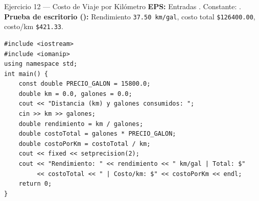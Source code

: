 \documentclass[11pt,letterpaper]{article}
\begin{document}
\begin{solucion}{Ejercicio 12 --- Costo de Viaje por Kilómetro}
\textbf{EPS:} Entradas . Constante: .\\
\textbf{Prueba de escritorio ():} Rendimiento \texttt{37.50 km/gal}, costo total \texttt{\$126400.00}, costo/km \texttt{\$421.33}.
\end{solucion}
\begin{lstlisting}[style=cppmonitoria]
#include <iostream>
#include <iomanip>
using namespace std;
int main() {
    const double PRECIO_GALON = 15800.0;
    double km = 0.0, galones = 0.0;
    cout << "Distancia (km) y galones consumidos: ";
    cin >> km >> galones;
    double rendimiento = km / galones;
    double costoTotal = galones * PRECIO_GALON;
    double costoPorKm = costoTotal / km;
    cout << fixed << setprecision(2);
    cout << "Rendimiento: " << rendimiento << " km/gal | Total: $"
         << costoTotal << " | Costo/km: $" << costoPorKm << endl;
    return 0;
}
\end{lstlisting}
\end{document}
